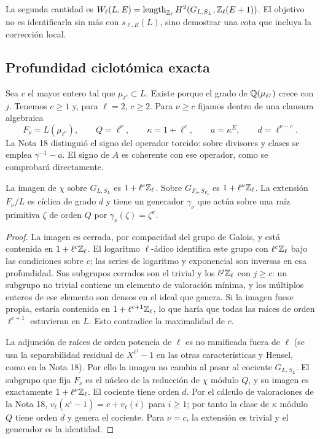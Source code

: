 La segunda cantidad es $W_\ell(L,E)=\operatorname{length}_{\mathbb{Z}_\ell}H^2(G_{L,S_L},\mathbb{Z}_\ell(E+1))$. El objetivo no es identificarla sin más con $s_{\ell,E}(L)$, sino demostrar una cota que incluya la corrección local.

\subsection{Profundidad ciclotómica exacta}

Sea $c$ el mayor entero tal que $\mu_{\ell^c}\subset L$. Existe porque el grado de $\mathbb{Q}(\mu_{\ell^j})$ crece con $j$. Tenemos $c\ge1$ y, para $\ell=2$, $c\ge2$. Para $\nu\ge c$ fijamos dentro de una clausura algebraica
\begin{equation}
 F_\nu=L(\mu_{\ell^\nu}),\qquad Q=\ell^\nu,\qquad
 \kappa=1+\ell^c,\qquad a=\kappa^E,\qquad d=\ell^{\nu-c}.
 \label{eq:ts-capa}
\end{equation}
La Nota 18 distinguió el signo del operador torcido: sobre divisores y clases se emplea $\gamma^{-1}-a$. El signo de $A$ es coherente con ese operador, como se comprobará directamente.

\begin{lema}
\label{lem:ts-imagen}
La imagen de $\chi$ sobre $G_{L,S_L}$ es $1+\ell^c\mathbb{Z}_\ell$. Sobre $G_{F_\nu,S_{F_\nu}}$ es $1+\ell^\nu\mathbb{Z}_\ell$. La extensión $F_\nu/L$ es cíclica de grado $d$ y tiene un generador $\gamma_\nu$ que actúa sobre una raíz primitiva $\zeta$ de orden $Q$ por $\gamma_\nu(\zeta)=\zeta^\kappa$.
\end{lema}
\begin{proof}
La imagen es cerrada, por compacidad del grupo de Galois, y está contenida en $1+\ell^c\mathbb{Z}_\ell$. El logaritmo $\ell$-ádico identifica este grupo con $\ell^c\mathbb{Z}_\ell$ bajo las condiciones sobre $c$; las series de logaritmo y exponencial son inversas en esa profundidad. Sus subgrupos cerrados son el trivial y los $\ell^j\mathbb{Z}_\ell$ con $j\ge c$: un subgrupo no trivial contiene un elemento de valoración mínima, y los múltiplos enteros de ese elemento son densos en el ideal que genera. Si la imagen fuese propia, estaría contenida en $1+\ell^{c+1}\mathbb{Z}_\ell$, lo que haría que todas las raíces de orden $\ell^{c+1}$ estuvieran en $L$. Esto contradice la maximalidad de $c$.

La adjunción de raíces de orden potencia de $\ell$ es no ramificada fuera de $\ell$ (se usa la separabilidad residual de $X^{\ell^j}-1$ en las otras características y Hensel, como en la Nota 18). Por ello la imagen no cambia al pasar al cociente $G_{L,S_L}$. El subgrupo que fija $F_\nu$ es el núcleo de la reducción de $\chi$ módulo $Q$, y su imagen es exactamente $1+\ell^\nu\mathbb{Z}_\ell$. El cociente tiene orden $d$. Por el cálculo de valoraciones de la Nota 18, $v_\ell(\kappa^i-1)=c+v_\ell(i)$ para $i\ge1$; por tanto la clase de $\kappa$ módulo $Q$ tiene orden $d$ y genera el cociente. Para $\nu=c$, la extensión es trivial y el generador es la identidad.
\end{proof}

